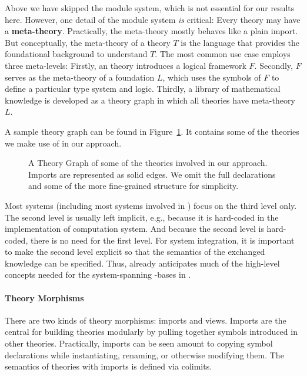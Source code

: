 


Above we have skipped the \MMT module system, which is not essential for our results here.
However, one detail of the \MMT module system \emph{is} critical: Every theory may have a \textbf{meta-theory}.
Practically, the meta-theory mostly behaves like a plain import.
But conceptually, the meta-theory of a theory $T$ is the language that provides the foundational background to understand $T$.
The most common use case employs three meta-levels: Firstly, an \MMT theory introduces a logical framework $F$.
Secondly, $F$ serves as the meta-theory of a foundation $L$, which uses the symbols of $F$ to define a particular type system and logic.
Thirdly, a library of mathematical knowledge is developed as a theory graph in which all theories have meta-theory $L$.

A sample theory graph can be found in Figure~\ref{fig:odk_theories}.
It contains some of the theories we make use of in our approach.

\begin{figure}[ht]\centering
  \providecommand\myxscale{3}
  \providecommand\myyscale{1.5}
  \providecommand\myfontsize{\footnotesize}
             
  \caption[Theories involved in our architecture]{A Theory Graph of some of the theories
    involved in our approach.  Imports are represented as solid edges.  We omit the full
    declarations and some of the more fine-grained structure for simplicity.  }
  \label{fig:odk_theories}
\end{figure}


Most systems (including most systems involved in \pn) focus on the third level only.
The second level is usually left implicit, e.g., because it is hard-coded in the implementation of computation system.
And because the second level is hard-coded, there is no need for the first level.
For system integration, it is important to make the second level explicit so that the semantics of the exchanged knowledge can be specified.
Thus, \MMT already anticipates much of the high-level concepts needed for the system-spanning \DKS-bases in \pn.

\paragraph{Theory Morphisms}
There are two kinds of theory morphisms: imports and views.
Imports are the central for building theories modularly by pulling together symbols introduced in other theories.
Practically, imports can be seen amount to copying symbol declarations while instantiating, renaming, or otherwise modifying them.
The semantics of theories with imports is defined via colimits.

